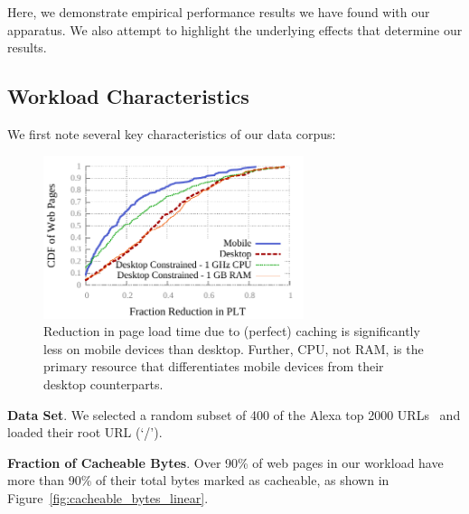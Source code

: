 Here, we demonstrate empirical performance results we have found with our
apparatus. We also attempt to highlight the underlying effects that determine
our results.

\subsection{Workload Characteristics}
We first note several key characteristics of our data corpus:
\begin{figure}[t]
    \includegraphics[width=3in]{../graphs/percent_plt_reduction/percent_reduction_linear.pdf}
    \caption[]{\label{fig:percent_reduction_linear}Reduction in page load time due to (perfect) caching is significantly less on mobile devices than desktop. Further, CPU, not RAM, is the primary resource that differentiates mobile devices from their desktop counterparts.}
\end{figure}

\textbf{Data Set}. We selected a random subset of 400 of the Alexa top 2000 URLs~\cite{alexa} and loaded their root URL (`/').

\textbf{Fraction of Cacheable Bytes}. Over 90\% of web pages in our workload have more than 90\% of their total bytes marked as cacheable, as shown in Figure~\ref{fig:cacheable_bytes_linear}. %

